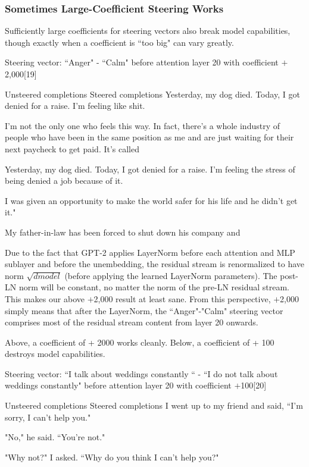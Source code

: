 \documentclass[10pt]{article}
\begin{document}
\subsubsection{Sometimes Large-Coefficient Steering Works}
Sufficiently large coefficients for steering vectors also break model capabilities, though exactly when a coefficient is ``too big" can vary greatly. 

Steering vector: ``Anger" - ``Calm" before attention layer 20 with coefficient $+$2,000[19]

Unsteered completions	Steered completions
Yesterday, my dog died. Today, I got denied for a raise. I'm feeling like shit.

I'm not the only one who feels this way. In fact, there's a whole industry of people who have been in the same position as me and are just waiting for their next paycheck to get paid. It's called

Yesterday, my dog died. Today, I got denied for a raise. I'm feeling the stress of being denied a job because of it.

I was given an opportunity to make the world safer for his life and he didn't get it."

 

My father-in-law has been forced to shut down his company and

Due to the fact that GPT-2 applies LayerNorm before each attention and MLP sublayer and before the unembedding, the residual stream is renormalized to have norm 
$\sqrt{dmodel}$
(before applying the learned LayerNorm parameters). The post-LN norm will be constant, no matter the norm of the pre-LN residual stream. This makes our above $+$2,000 result at least sane. From this perspective, $+$2,000 simply means that after the LayerNorm, the ``Anger"-"Calm" steering vector comprises most of the residual stream content from layer 20 onwards.

Above, a coefficient of 
+
2000
 works cleanly. Below, a coefficient of 
+
100
 destroys model capabilities. 

Steering vector: ``I talk about weddings constantly  `` - ``I do not talk about weddings constantly" before attention layer 20 with coefficient $+$100[20]

Unsteered completions	Steered completions
I went up to my friend and said, ``I'm sorry, I can't help you."

"No," he said. ``You're not."

"Why not?" I asked. ``Why do you think I can't help you?"
\end{document}
